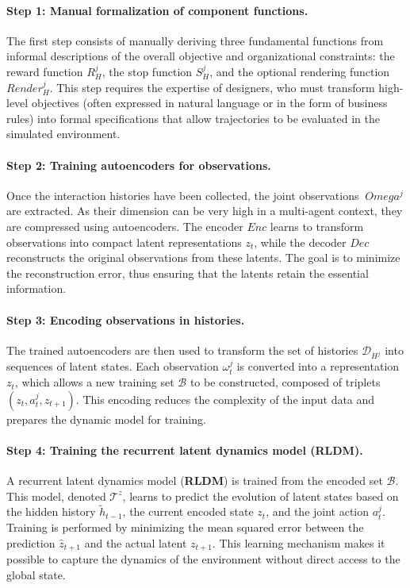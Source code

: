 \documentclass[pdflatex,sn-mathphys-num]{sn-jnl}%
\theoremstyle{thmstyleone}%
\theoremstyle{thmstyletwo}%
\theoremstyle{thmstylethree}%
\begin{document}
\paragraph*{Step 1: Manual formalization of component functions.}
The first step consists of manually deriving three fundamental functions from informal descriptions of the overall objective and organizational constraints: the reward function $R^j_H$, the stop function $S^j_H$, and the optional rendering function $Render^j_H$.
This step requires the expertise of designers, who must transform high-level objectives (often expressed in natural language or in the form of business rules) into formal specifications that allow trajectories to be evaluated in the simulated environment.

\paragraph*{Step 2: Training autoencoders for observations.}
Once the interaction histories have been collected, the joint observations $\ Omega^j$ are extracted.
As their dimension can be very high in a multi-agent context, they are compressed using autoencoders.
The encoder $Enc$ learns to transform observations into compact latent representations $z_t$, while the decoder $Dec$ reconstructs the original observations from these latents.
The goal is to minimize the reconstruction error, thus ensuring that the latents retain the essential information.

\paragraph*{Step 3: Encoding observations in histories.}
The trained autoencoders are then used to transform the set of histories $\mathcal{D}_{H^j}$ into sequences of latent states.
Each observation $\omega_t^j$ is converted into a representation $z_t$, which allows a new training set $\mathcal{B}$ to be constructed, composed of triplets $(z_t, a_t^j, z_{t+1})$.
This encoding reduces the complexity of the input data and prepares the dynamic model for training.

\paragraph*{Step 4: Training the recurrent latent dynamics model (RLDM).}
A recurrent latent dynamics model (\textbf{RLDM}) is trained from the encoded set $\mathcal{B}$.
This model, denoted $\mathcal{T}^z$, learns to predict the evolution of latent states based on the hidden history $\tilde{h}_{t-1}$, the current encoded state $z_t$, and the joint action $a_t^j$.
Training is performed by minimizing the mean squared error between the prediction $\hat {z}_{t+1}$ and the actual latent $z_{t+1}$.
This learning mechanism makes it possible to capture the dynamics of the environment without direct access to the global state.
\end{document}
